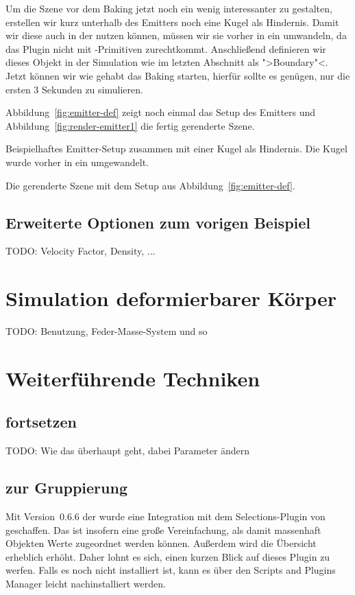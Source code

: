 \documentclass[10pt,DIV=14,a4paper]{scrartcl}
\begin{document}
Um die Szene vor dem Baking jetzt noch ein wenig interessanter zu
gestalten, erstellen wir kurz unterhalb des Emitters noch eine Kugel als
Hindernis. Damit wir diese auch in der \fluidsim nutzen können, müssen
wir sie vorher in ein \TriMesh umwandeln, da das Plugin nicht mit
\aoi-Primitiven zurechtkommt. Anschließend definieren wir dieses Objekt
in der Simulation wie im letzten Abschnitt als ">Boundary"<. Jetzt
können wir wie gehabt das Baking starten, hierfür sollte es genügen, nur
die ersten 3 Sekunden zu simulieren.

Abbildung~\ref{fig:emitter-def} zeigt noch einmal das Setup des Emitters
und Abbildung~\ref{fig:render-emitter1} die fertig gerenderte Szene.

{Beispielhaftes Emitter-Setup zusammen mit einer Kugel als Hindernis.
Die Kugel wurde vorher in ein \TriMesh umgewandelt.}

{Die gerenderte Szene mit dem Setup aus
Abbildung~\ref{fig:emitter-def}.}

\subsection{Erweiterte Optionen zum vorigen Beispiel}
TODO: Velocity Factor, Density, ... 



\pagebreak
\section{Simulation deformierbarer Körper}
TODO: Benutzung, Feder-Masse-System und so


\pagebreak
\section{Weiterführende Techniken}

\subsection{ fortsetzen}
TODO: Wie das überhaupt geht, dabei Parameter ändern

\subsection{ zur Gruppierung}
Mit Version~0.6.6 der \fluidsim wurde eine Integration mit dem
Selections-Plugin von \aoi geschaffen. Das ist insofern eine große
Vereinfachung, als damit massenhaft Objekten Werte zugeordnet werden
können. Außerdem wird die Übersicht erheblich erhöht. Daher lohnt es
sich, einen kurzen Blick auf dieses Plugin zu werfen. Falls es noch
nicht installiert ist, kann es über den Scripts and Plugins Manager
leicht nachinstalliert werden.
\end{document}
